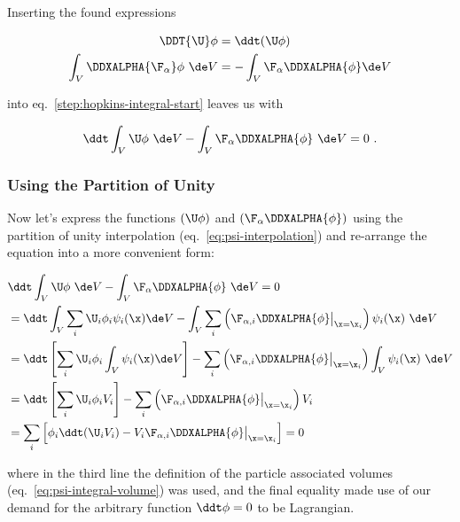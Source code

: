 Inserting the found expressions

\begin{align}
    \DDT{\U} \phi &= \ddt ( \U \phi ) \\
    \int_V \DDXALPHA{\F_\alpha}\phi \ \de V &= - \int_V \F_\alpha \DDXALPHA{\phi} \de V
\end{align}

into eq.~\ref{step:hopkins-integral-start} leaves us with

\begin{align}
    \ddt \int_V \U \phi \ \de V - \int_V \F_\alpha \DDXALPHA{\phi} \ \de V = 0 \ .
\end{align}








\subsubsection{Using the Partition of Unity}

Now let's express the functions $(\U \phi)$ and $\left( \F_\alpha \DDXALPHA{\phi}  \right)$ using
the partition of unity interpolation (eq.~\ref{eq:psi-interpolation}) and re-arrange the equation
into a more convenient form:

\begin{align}
    & \ddt \int_V \U \phi \ \de V - \int_V \F_\alpha \DDXALPHA{\phi} \ \de V = 0 \\
    &= \ddt \int_V \sum_i \U_i \phi_i \psi_i(\x) \de V -
    \int_V \sum_i \left( \F_{\alpha,i} \DDXALPHA{\phi} \big|_{\x = \x_i} \right) \psi_i(\x) \ \de V
\\
    &= \ddt \left[\sum_i \U_i \phi_i \int_V \psi_i(\x) \de V \right] -
    \sum_i \left( \F_{\alpha,i} \DDXALPHA{\phi} \big|_{\x = \x_i} \right) \int_V \psi_i(\x) \ \de V
\\
    &= \ddt \left[\sum_i \U_i \phi_i V_i \right] -
    \sum_i \left( \F_{\alpha,i} \DDXALPHA{\phi} \big|_{\x = \x_i} \right) V_i \\
    &= \sum_i \left[ \phi_i \ddt (\U_i V_i) -
    V_i \F_{\alpha,i} \DDXALPHA{\phi} \big|_{\x = \x_i} \right] = 0
\label{step:intermediate-hopkins1}
\end{align}

where in the third line the definition of the particle associated volumes
(eq.~\ref{eq:psi-integral-volume}) was used, and the final equality made use of our demand for the
arbitrary function $\ddt \phi = 0$ to be Lagrangian.

